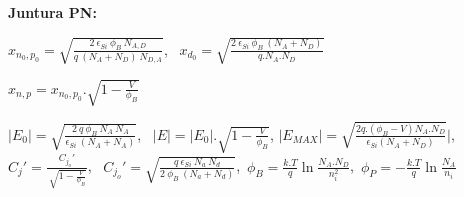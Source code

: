\documentclass[a4paper,12pt]{article}
\newenvironment{ecuaciones}[1]{
  \noindent
  \begin{lrbox}{\ecuacionesbox}
  \begin{minipage}{\linewidth}\ignorespaces
  {\footnotesize\textbf{#1:}}
} {
  \end{minipage}
  \end{lrbox}%
  \makebox[\linewidth]{%
  \fbox{\usebox{\ecuacionesbox}}%
  }
  \par
  \vspace{0.5mm}
}
\begin{document}
    \begin{ecuaciones}{Juntura PN}
   
    $x_{n_0 , p_0} = \sqrt{\frac{2 \ \epsilon_{Si} \ \phi_B \ N_{A,D} }{q \ (N_A + N_D) \ N_{D,A}}}
    $, \ 
    $x_{d_0}= \sqrt{\frac{2 \ \epsilon_{Si} \ \phi_B \ (N_A + N_D) }{q. N_A . N_D  }}$\
    
    $x_{n,p}= x_{n_0,p_0}. \sqrt{1-\frac{V}{\phi_B}} $\
    
 
    
    
    $|E_0| = \sqrt{\frac{2\ q \ \phi_B \ N_A \ N_A }{\epsilon_{Si} \ (N_A + N_A)}}
    $, \ 
    $|E|= |E_0| . \sqrt{1-\frac{V}{\phi_B}}$,
    $|E_{MAX}|=\sqrt{\frac{2q.(\phi_B - V)N_A . N_D}{\epsilon_{Si}(N_A + N_D)}}| $,
    $ C_j' =  \frac{C_{j_o}'}{\ \sqrt{1-\frac{V}{\phi_B}}}
    $, \ 
    $C_{j_o}' = \sqrt{\frac{ q \ \epsilon_{Si} \ N_a \ N_d }{2 \ \phi_B  \ (N_a + N_d)}}
    $,\
    $\phi_B = \frac{k.T}{q} \ln{\frac{N_A .N_D}{n_i^{2}}}
    $,\
     $\phi_P = -\frac{k.T}{q} \ln{\frac{N_A}{n_i}}$
    \end{ecuaciones}
\end{document}

